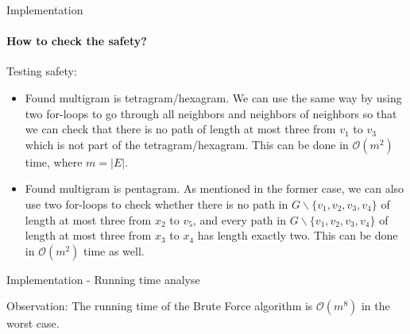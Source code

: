 \documentclass{beamer}
\begin{document}
\begin{frame}{Implementation}
\framesubtitle{How to check the safety?}
\begin{block}{Testing safety:}
    \begin{itemize}
        \item Found multigram is tetragram/hexagram. We can use the same way by using two for-loops to go through all neighbors and neighbors of neighbors so that we can check that there is no path of length at most three from $v_1$ to $v_3$ which is not part of the tetragram/hexagram. This can be done in $\mathcal{O}(m^2)$ time, where $m = |E|$.
        
        \item Found multigram is pentagram. As mentioned in the former case, we can also use two for-loops to check whether there is no path in $G \backslash \{v_1, v_2, v_3, v_4\}$ of length at most three from $x_2$ to $v_5$, and every path in $G \backslash \{v_1, v_2, v_3, v_4\}$ of length at most three from $x_3$ to $x_4$ has length exactly two. This can be done in $\mathcal{O}(m^2)$ time as well.
    \end{itemize}
\end{block}
\end{frame}

\begin{frame}{Implementation - Running time analyse}
\begin{block}{Observation:}
The running time of the Brute Force algorithm is $\mathcal{O}(m^8)$ in the worst case.
\end{block}

\end{frame}
\end{document}
